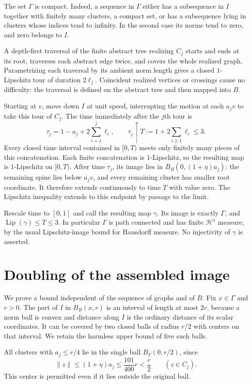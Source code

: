 \documentclass[11pt,a4paper]{article}
\theoremstyle{definition}
\theoremstyle{remark}
\numberwithin{equation}{section}
\newcommand{\norm}[1]{\lVert #1\rVert}
\newcommand{\cB}{\overline B}
\begin{document}
The set $\Gamma$ is compact. Indeed, a sequence in $\Gamma$ either has a subsequence in $I$ together with finitely many clusters, a compact set, or has a subsequence lying in clusters whose indices tend to infinity. In the second case its norms tend to zero, and zero belongs to $I$.

A depth-first traversal of the finite abstract tree realizing $C_j$ starts and ends at its root, traverses each abstract edge twice, and covers the whole realized graph. Parametrizing each traversal by its ambient norm length gives a closed $1$-Lipschitz tour of duration $2\ell_j$. Coincident realized vertices or crossings cause no difficulty: the traversal is defined on the abstract tree and then mapped into $B$.

Starting at $v$, move down $I$ at unit speed, interrupting the motion at each $a_jv$ to take this tour of $C_j$. The time immediately after the $j$th tour is
\[
 \tau_j=1-a_j+2\sum_{i=1}^j\ell_i,
 \qquad \tau_j\uparrow T:=1+2\sum_{i\ge1}\ell_i\le3.
\]
Every closed time interval contained in $[0,T)$ meets only finitely many pieces of this concatenation. Each finite concatenation is $1$-Lipschitz, so the resulting map is $1$-Lipschitz on $[0,T)$. After time $\tau_j$, its image lies in $\cB_B(0,(1+\eta)a_j)$: the remaining spine lies below $a_jv$, and every remaining cluster has smaller root coordinate. It therefore extends continuously to time $T$ with value zero. The Lipschitz inequality extends to this endpoint by passage to the limit.

Rescale time to $[0,1]$ and call the resulting map $\gamma$. Its image is exactly $\Gamma$, and $\operatorname{Lip}(\gamma)\le T\le3$. In particular $\Gamma$ is path connected and has finite $\mathcal H^1$ measure, by the usual Lipschitz-image bound for Hausdorff measure. No injectivity of $\gamma$ is asserted.

\section{Doubling of the assembled image}
We prove a bound independent of the sequence of graphs and of $B$. Fix $x\in\Gamma$ and $r>0$. The part of $I$ in $\cB_B(x,r)$ is an interval of length at most $2r$, because a norm ball is convex and distance along $I$ is the ordinary distance of its scalar coordinates. It can be covered by two closed balls of radius $r/2$ with centers on that interval. We retain the harmless upper bound of five such balls.

All clusters with $a_j\le r/4$ lie in the single ball $\cB_\Gamma(0,r/2)$, since
\[
 \norm z\le(1+\eta)a_j\le\frac{101}{400}r<\frac r2
 \qquad(z\in C_j).
\]
This center is permitted even if it lies outside the original ball.
\end{document}
